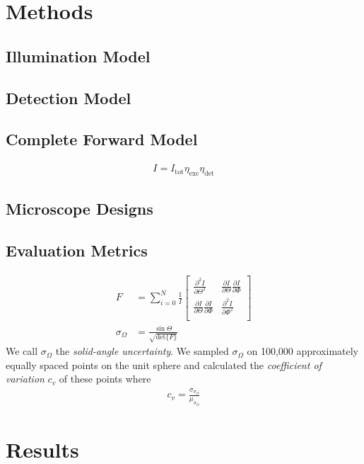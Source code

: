 \documentclass[10pt]{article}
\begin{document}
\section{Methods}
\subsection{Illumination Model}

\subsection{Detection Model}

\subsection{Complete Forward Model}
\begin{align}
  I = I_{\text{tot}}\eta_{\text{exc}}\eta_{\text{det}}
\end{align}

\subsection{Microscope Designs}

\subsection{Evaluation Metrics}
\begin{align}
  F &= \sum_{i=0}^N \frac{1}{I}
  \begin{bmatrix}
    \frac{\partial^2 I}{\partial \Theta^2}&\frac{\partial I}{\partial \Theta}\frac{\partial I}{\partial \Phi}\\
    \frac{\partial I}{\partial \Theta}\frac{\partial I}{\partial \Phi}&\frac{\partial^2 I}{\partial \Phi^2}\\    
  \end{bmatrix}\\
  \sigma_{\Omega} &= \frac{\sin\Theta}{\sqrt{\text{det}\{F\}}}
\end{align}
We call $\sigma_{\Omega}$ the \emph{solid-angle uncertainty}. 
We sampled $\sigma_{\Omega}$ on 100,000 approximately equally
spaced points on the unit sphere and calculated the \emph{coefficient of variation}
$c_v$ of these points where
\begin{align}
  c_v = \frac{\sigma_{\sigma_{\Omega}}}{\mu_{\sigma_{\Omega}}}
\end{align}

\section{Results}
\end{document}
